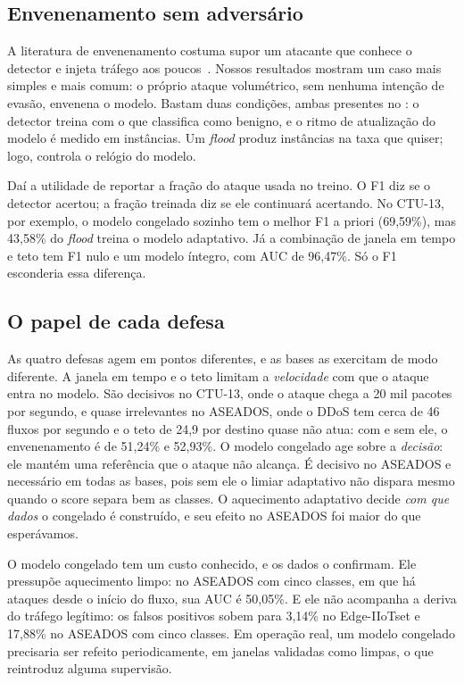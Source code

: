 \subsection{Envenenamento sem adversário}
A literatura de envenenamento costuma supor um atacante que conhece o detector e injeta tráfego
aos poucos~\cite{rubinstein2009antidote}. Nossos resultados mostram um caso mais simples e mais
comum: o próprio ataque volumétrico, sem nenhuma intenção de evasão, envenena o modelo. Bastam
duas condições, ambas presentes no \modus: o detector treina com o que classifica como benigno, e
o ritmo de atualização do modelo é medido em instâncias. Um \emph{flood} produz instâncias na
taxa que quiser; logo, controla o relógio do modelo.

Daí a utilidade de reportar a fração do ataque usada no treino. O F1 diz se o detector acertou; a
fração treinada diz se ele continuará acertando. No CTU-13, por exemplo, o modelo congelado
sozinho tem o melhor F1 a priori (69,59\%), mas 43,58\% do \emph{flood} treina o modelo adaptativo.
Já a combinação de janela em tempo e teto tem F1 nulo e um modelo íntegro, com AUC de 96,47\%. Só
o F1 esconderia essa diferença.

\subsection{O papel de cada defesa}
As quatro defesas agem em pontos diferentes, e as bases as exercitam de modo diferente. A janela em
tempo e o teto limitam a \emph{velocidade} com que o ataque entra no modelo. São decisivos no
CTU-13, onde o ataque chega a 20 mil pacotes por segundo, e quase irrelevantes no ASEADOS, onde o
DDoS tem cerca de 46 fluxos por segundo e o teto de 24,9 por destino quase não atua: com e sem
ele, o envenenamento é de 51,24\% e 52,93\%. O modelo congelado age sobre a \emph{decisão}: ele mantém uma referência que o ataque não
alcança. É decisivo no ASEADOS e necessário em todas as bases, pois sem ele o limiar adaptativo
não dispara mesmo quando o score separa bem as classes. O aquecimento adaptativo decide \emph{com
que dados} o congelado é construído, e seu efeito no ASEADOS foi maior do que esperávamos.

O modelo congelado tem um custo conhecido, e os dados o confirmam. Ele pressupõe aquecimento limpo:
no ASEADOS com cinco classes, em que há ataques desde o início do fluxo, sua AUC é 50,05\%. E ele não
acompanha a deriva do tráfego legítimo: os falsos positivos sobem para 3,14\% no Edge-IIoTset e
17,88\% no ASEADOS com cinco classes. Em operação real, um modelo congelado precisaria ser refeito
periodicamente, em janelas validadas como limpas, o que reintroduz alguma supervisão.

